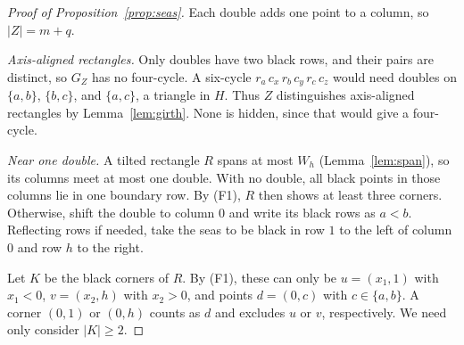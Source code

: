 \documentclass[12pt]{article}
\theoremstyle{plain}
\theoremstyle{definition}
\theoremstyle{remark}
\begin{document}
\begin{proof}[Proof of Proposition~\ref{prop:seas}]
Each double adds one point to a column, so $|Z|=m+q$.

\emph{Axis-aligned rectangles.} Only doubles have two black rows, and their pairs are distinct,
so $G_Z$ has no four-cycle. A six-cycle $r_a\,c_x\,r_b\,c_y\,r_c\,c_z$ would need doubles on
$\{a,b\}$, $\{b,c\}$, and $\{a,c\}$, a triangle in $H$. Thus $Z$ distinguishes axis-aligned rectangles by Lemma~\ref{lem:girth}.
None is hidden, since that would give a four-cycle.

\emph{Near one double.} A tilted rectangle $R$ spans at most $W_h$
(Lemma~\ref{lem:span}), so its columns meet at most one double. With no double,
all black points in those columns lie in one boundary row. By (F1), $R$ then
shows at least three corners. Otherwise, shift the double to column $0$
and write its black rows as $a<b$. Reflecting rows if needed, take the seas
to be black in row $1$ to the left of column $0$ and row $h$ to the right.

Let $K$ be the black corners of $R$. By (F1), these can only be
$u=(x_1,1)$ with $x_1<0$, $v=(x_2,h)$ with $x_2>0$, and points $d=(0,c)$
with $c\in\{a,b\}$. A corner $(0,1)$ or $(0,h)$ counts as $d$ and
excludes $u$ or $v$, respectively. We need only consider $|K|\ge2$.


\end{proof}
\end{document}
